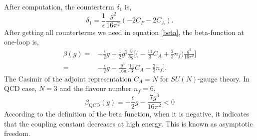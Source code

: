 \documentclass[a4paper,12pt]{article}
\begin{document}
After computation, the counterterm $\delta_1$ is,
\begin{equation}
    \delta_1=\frac{1}{\epsilon}\frac{g^2}{16\pi^2}(-2C_F-2C_A).
\end{equation}
After getting all counterterms we need in equation \eqref{beta}, the beta-function at one-loop is,
\begin{equation}
    \begin{split}
        \beta(g)=&-\frac{\epsilon}{2}g+\frac{1}{2}g^2\frac{\partial}{\partial g}\bigg[\bigg(-\frac{11}{3}C_A+\frac{2}{3}n_f\bigg)\frac{g^2}{16 \pi^2}\bigg]\\
            =&-\frac{\epsilon}{2}g-\frac{g^3}{16 \pi}\bigg[\frac{11}{3}C_A-\frac{2}{3}n_f\bigg].
    \end{split}
\end{equation}
The Casimir of the adjoint representation $C_A=N$ for $SU(N)$-gauge theory. In QCD case, $N=3$ and the flavour number $n_f=6$,
\begin{equation}
    \beta_{\text{QCD}}(g)=-\frac{\epsilon}{2}g-\frac{7g^3}{16\pi^2}<0 
\end{equation}
According to the definition of the beta function, when it is negative, it indicates that the coupling constant decreases at high energy. This is known as asymptotic freedom.


\end{document}
